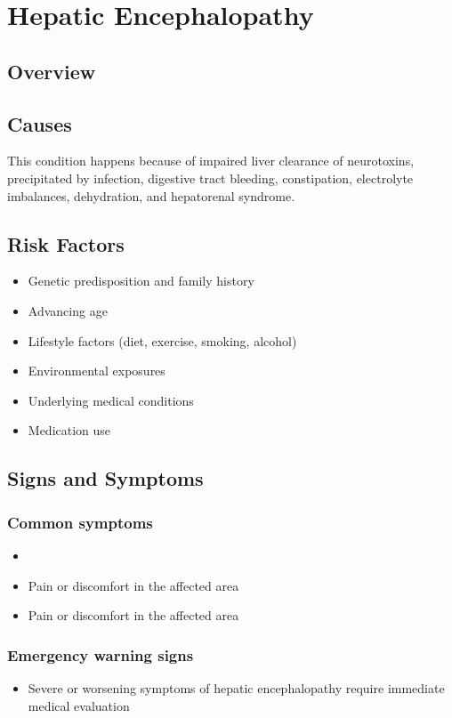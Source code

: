 \chapter{Hepatic Encephalopathy}
\label{sec:Hepatic Encephalopathy}

\section{Overview}

\section{Causes}
This condition happens because of impaired liver clearance of neurotoxins, precipitated by infection, digestive tract bleeding, constipation, electrolyte imbalances, dehydration, and hepatorenal syndrome.     
\section{Risk Factors}

\begin{itemize}[noitemsep]
  \item Genetic predisposition and family history
  \item Advancing age
  \item Lifestyle factors (diet, exercise, smoking, alcohol)
  \item Environmental exposures
  \item Underlying medical conditions
  \item Medication use
\end{itemize}
\section{Signs and Symptoms}

\subsection{Common symptoms}
\begin{itemize}[noitemsep]
  \item \item Pain or discomfort in the affected area    \item Pain or discomfort in the affected area
  \end{itemize}

\subsection{Emergency warning signs}
\begin{itemize}[noitemsep]
  \item Severe or worsening symptoms of hepatic encephalopathy require immediate medical evaluation
\end{itemize}
